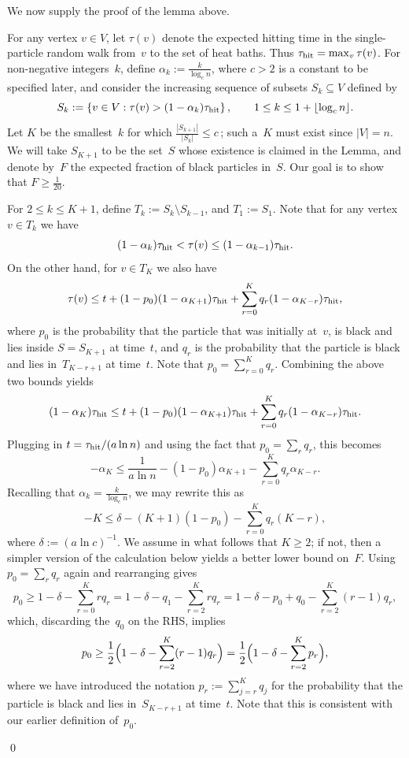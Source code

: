 \documentclass[11pt]{article}
\theoremstyle{plain}
\theoremstyle{definition}
\theoremstyle{remark}
\numberwithin{equation}{section}
\newcommand{\hit}{\tau_{\rm hit}}
\newenvironment{proofof}[1]{{\par\bigskip\noindent \em Proof of #1.}\/}{\hfill\qed\bigskip}
\begin{document}
We now supply the proof of the lemma above.

\begin{proofof}{Lemma~\ref{lem:lowerbd}}
For any vertex $v\in V$, let $\tau(v)$ denote the expected hitting time in the single-particle random walk
from~$v$ to the set of heat baths. 
Thus $\hit=\max_v \tau(v)$.  For non-negative integers~$k$, define $\alpha_k:=\frac{k}{\log_c n}$, where $c>2$
is a constant to be specified later, and consider the increasing sequence of subsets $S_k\subseteq V$ defined by $$
   S_k := \left\{v\in V: \tau(v) > (1-\alpha_k)\hit\right\},\qquad 1\le k\le 1+\lfloor\log_c n\rfloor.  $$
Let $K$ be the smallest~$k$ for which $\frac{|S_{k+1}|}{|S_k|} \le c\,$; such a~$K$ must exist
since $|V|=n$.  We will take $S_{K+1}$ to be the set~$S$ whose existence is claimed in the Lemma, 
and denote by~$F$ the expected fraction of black particles in~$S$. Our goal is to show that $F\ge\frac{1}{20}$.

For $2\le k\le K+1$, define $T_k:=S_k\setminus S_{k-1}$, and $T_1:=S_1$.  Note that for any vertex $v\in T_k$ we have $$
    (1-\alpha_k)\hit < \tau(v) \le (1-\alpha_{k-1})\hit.  $$
On the other hand, for $v\in T_K$ we also have $$
    \tau(v) \le t + (1-p_0)(1-\alpha_{K+1})\hit + \sum_{r=0}^{K} q_r(1-\alpha_{K-r})\hit,   $$
where $p_0$ is the probability that the particle that was initially at~$v$, is black and lies inside $S=S_{K+1}$ at time~$t$,
and $q_r$ is the probability that the particle is black and lies in~$T_{K-r+1}$ at time~$t$.  Note that $p_0=\sum_{r=0}^K q_r $.
Combining the above two bounds yields $$
    (1-\alpha_K)\hit \le t + (1-p_0)(1-\alpha_{K+1})\hit + \sum_{r=0}^{K} q_r(1-\alpha_{K-r})\hit.  $$
Plugging in $t=\hit/(a\ln n)$ and using the fact that $p_0 = \sum_r q_r$, this becomes $$
    -\alpha_K \le \frac{1}{a\ln n}  -(1-p_0)\alpha_{K+1} - \sum_{r=0}^{K} q_r\alpha_{K-r}.  $$
Recalling that $\alpha_k=\frac{k}{\log_c n}$, we may rewrite this as $$
    -K \le \delta -(K+1)(1-p_0) - \sum_{r=0}^{K} q_r(K-r), $$
where $\delta:=(a\ln c)^{-1}$.  We assume in what follows that $K\ge 2$; if not, then a simpler version of 
the calculation below yields a better lower bound on~$F$.  Using $p_0 = \sum_r q_r$ again and rearranging gives $$
     p_0 \ge 1-\delta - \sum_{r=0}^{K} rq_r = 1 - \delta - q_1 - \sum_{r=2}^K rq_r = 1 - \delta -p_0 + q_0 - \sum_{r=2}^K (r-1)q_r,  $$
which, discarding the~$q_0$ on the RHS, implies
\begin{equation}\label{eq:pbound}
     p_0 \ge \frac{1}{2}\Bigl(1-\delta - \sum_{r=2}^K (r-1)q_r\Bigr) =\frac{1}{2}\Bigl(1-\delta - \sum_{r=2}^K p_r\Bigr),
\end{equation}     
where we have introduced the notation $p_r:=\sum_{j=r}^K q_j$ for the probability that the particle is black
and lies in~$S_{K-r+1}$ at time~$t$.  Note that this is consistent with our earlier definition of~$p_0$.
   

\end{proofof}
\end{document}
